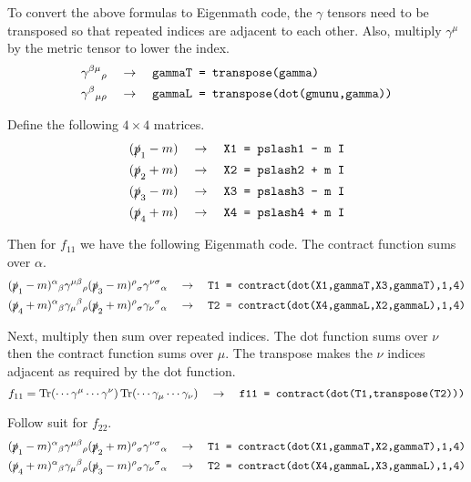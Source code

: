 To convert the above formulas to Eigenmath code,
the $\gamma$ tensors need to be transposed
so that repeated indices are adjacent to each other.
Also, multiply $\gamma^\mu$ by the metric tensor to lower the index.
\begin{align*}
\gamma^{\beta\mu}{}_\rho\quad&\rightarrow\quad
\text{\tt gammaT = transpose(gamma)}\\
\gamma^\beta{}_{\mu\rho}\quad&\rightarrow\quad
\text{\tt gammaL = transpose(dot(gmunu,gamma))}
\end{align*}

Define the following $4\times4$ matrices.
\begin{align*}
(\slashed{p}_1-m)\quad&\rightarrow\quad\text{\tt X1 = pslash1 - m I}\\
(\slashed{p}_2+m)\quad&\rightarrow\quad\text{\tt X2 = pslash2 + m I}\\
(\slashed{p}_3-m)\quad&\rightarrow\quad\text{\tt X3 = pslash3 - m I}\\
(\slashed{p}_4+m)\quad&\rightarrow\quad\text{\tt X4 = pslash4 + m I}
\end{align*}

Then for $f_{11}$ we have the following Eigenmath code.
The contract function sums over $\alpha$.
\begin{align*}
(\slashed{p}_1-m)^\alpha{}_\beta
\gamma^{\mu\beta}{}_\rho
(\slashed{p}_3-m)^\rho{}_\sigma
\gamma^{\nu\sigma}{}_\alpha
\quad&\rightarrow\quad
\text{\tt T1 = contract(dot(X1,gammaT,X3,gammaT),1,4)}\\
(\slashed{p}_4+m)^\alpha{}_\beta
\gamma_\mu{}^\beta{}_\rho
(\slashed{p}_2+m)^\rho{}_\sigma
\gamma_\nu{}^\sigma{}_\alpha
\quad&\rightarrow\quad
\text{\tt T2 = contract(dot(X4,gammaL,X2,gammaL),1,4)}
\end{align*}

Next, multiply then sum over repeated indices.
The dot function sums over $\nu$ then the contract function
sums over $\mu$. The transpose makes the $\nu$ indices adjacent
as required by the dot function.
$$
f_{11}=
\mathop{\rm Tr}(\cdots\gamma^\mu\cdots\gamma^\nu)
\mathop{\rm Tr}(\cdots\gamma_\mu\cdots\gamma_\nu)
\quad\rightarrow\quad
\text{\tt f11 = contract(dot(T1,transpose(T2)))}
$$

Follow suit for $f_{22}$.
\begin{align*}
(\slashed{p}_1-m)^\alpha{}_\beta
\gamma^{\mu\beta}{}_\rho
(\slashed{p}_2+m)^\rho{}_\sigma
\gamma^{\nu\sigma}{}_\alpha
\quad&\rightarrow\quad
\text{\tt T1 = contract(dot(X1,gammaT,X2,gammaT),1,4)}
\\
(\slashed{p}_4+m)^\alpha{}_\beta
\gamma_\mu{}^\beta{}_\rho
(\slashed{p}_3-m)^\rho{}_\sigma
\gamma_\nu{}^\sigma{}_\alpha
\quad&\rightarrow\quad
\text{\tt T2 = contract(dot(X4,gammaL,X3,gammaL),1,4)}
\end{align*}

